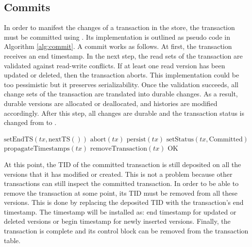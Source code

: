 \subsection{Commits}

In order to manifest the changes of a transaction in the store, the transaction must be committed using . Its implementation is outlined as pseudo code in Algorithm \ref{alg:commit}. A commit works as follows. At first, the transaction receives an end timestamp. In the next step, the read sets of the transaction are validated against read-write conflicts. If at least one read version has been updated or deleted, then the transaction aborts. This implementation could be too pessimistic but it preserves serializability. Once the validation succeeds, all change sets of the transaction are translated into durable changes. As a result, durable versions are allocated or deallocated, and histories are modified accordingly. After this step, all changes are durable and the transaction status is changed from  to .

\vspace{0.5cm}

\begin{algorithm}
\begin{algorithmic}[1]
\State $\text{setEndTS}(\textit{tx}, \text{nextTS}())$
\State \Return $\text{abort}(\textit{tx})$
\EndIf
\State $\text{persist}(\textit{tx})$
\State $\text{setStatus}(\textit{tx}, \text{Committed})$
\State $\text{propagateTimestamps}(\textit{tx})$
\State $\text{removeTransaction}(\textit{tx})$
\State \Return $\text{OK}$
\EndProcedure
\end{algorithmic}
\caption{}
\label{alg:commit}
\end{algorithm}

At this point, the TID of the committed transaction is still deposited on all the versions that it has modified or created. This is not a problem because other transactions can still inspect the committed transaction. In order to be able to remove the transaction at some point, its TID must be removed from all these versions. This is done by replacing the deposited TID with the transaction's end timestamp. The timestamp will be installed as: end timestamp for updated or deleted versions or begin timestamp for newly inserted versions. Finally, the transaction is complete and its control block can be removed from the transaction table.


